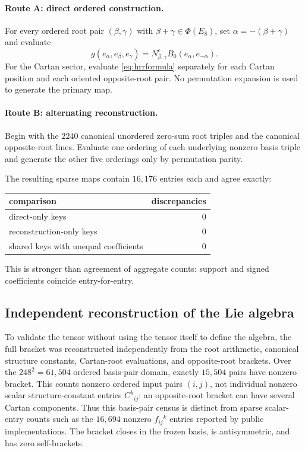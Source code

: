 \documentclass[11pt]{article}
\theoremstyle{definition}
\theoremstyle{remark}
\newcommand{\PhiE}{\Phi(E_8)}
\begin{document}
\paragraph{Route A: direct ordered construction.}
For every ordered root pair $(\beta,\gamma)$ with $\beta+\gamma\in\PhiE$, set $\alpha=-(\beta+\gamma)$ and evaluate
\[
g(e_\alpha,e_\beta,e_\gamma)
=N_{\beta,\gamma}^{\epsilon}B_0(e_\alpha,e_{-\alpha}).
\]
For the Cartan sector, evaluate \eqref{eq:hrrformula} separately for each Cartan position and each oriented opposite-root pair.  No permutation expansion is used to generate the primary map.

\paragraph{Route B: alternating reconstruction.}
Begin with the $2240$ canonical unordered zero-sum root triples and the canonical opposite-root lines.  Evaluate one ordering of each underlying nonzero basis triple and generate the other five orderings only by permutation parity.

The resulting sparse maps contain $16{,}176$ entries each and agree exactly:
\begin{center}
\begin{tabular}{lr}
\toprule
comparison & discrepancies\\
\midrule
direct-only keys & 0\\
reconstruction-only keys & 0\\
shared keys with unequal coefficients & 0\\
\bottomrule
\end{tabular}
\end{center}
This is stronger than agreement of aggregate counts: support and signed coefficients coincide entry-for-entry.

\subsection{Independent reconstruction of the Lie algebra}

To validate the tensor without using the tensor itself to define the algebra, the full bracket was reconstructed independently from the root arithmetic, canonical structure constants, Cartan-root evaluations, and opposite-root brackets.  Over the $248^2=61{,}504$ ordered basis-pair domain, exactly $15{,}504$ pairs have nonzero bracket.  This counts nonzero ordered input pairs $(i,j)$, not individual nonzero scalar structure-constant entries $C^k{}_{ij}$: an opposite-root bracket can have several Cartan components.  Thus this basis-pair census is distinct from sparse scalar-entry counts such as the $16{,}694$ nonzero $f_{ij}{}^k$ entries reported by public implementations.  The bracket closes in the frozen basis, is antisymmetric, and has zero self-brackets.
\end{document}
